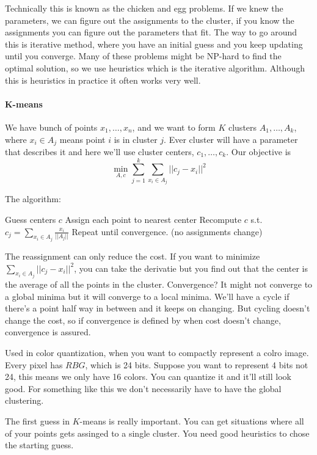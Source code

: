 Technically this is known as the chicken and egg problems. If we knew
the parameters, we can figure out the assignments to the cluster, if
you know the assignments you can figure out the parameters that
fit. The way to go around this is iterative method, where you have an
initial guess and you keep updating until you converge. Many of these problems
might be NP-hard to find the optimal solution, so we use heuristics
which is the iterative algorithm. Although this is heuristics in
practice it often works very well.

\paragraph{K-means}
\label{sec:k-means}
We have bunch of points $x_1, \dots, x_n$, and we want to form $K$
clusters $A_1, \dots , A_k$, where $x_i \in A_j$ means point $i$ is in
cluster $j$. Ever cluster will have a parameter that describes it and
here we'll use cluster centers, $c_1, \dots, c_k$. Our objective is
\begin{equation}
  \label{eq:41}
  \min_{A, c} \sum_{j=1}^k\sum_{x_i\in A_j} ||c_j - x_i||^2
\end{equation}

The algorithm:
\begin{enumerate}
\STATE   Guess centers $c$
\STATE Assign each point to nearest center
\STATE Recompute $c$ s.t. $c_j  = \sum_{x_i\in
  A_j}\frac{x_i}{||A_j||}$
\STATE Repeat until convergence. (no assignments change)
\end{enumerate}

The reassignment can only reduce the cost. If you want to
minimize $\sum_{x_i\in A_j} ||c_j - x_i||^2$, you can take the
derivatie but you find out that the center is the average of all the
points in the cluster. Convergence? It might not converge to a global
minima but it will converge to a local minima. We'll have a cycle if
there's a point half way in between and it keeps on changing. But
cycling doesn't change the cost, so if convergence is defined by when
cost doesn't change, convergence is assured. 

Used in color quantization, when you want to compactly represent a
colro image. Every pixel has $RBG$, which is 24 bits. Suppose you want
to represent 4 bits not 24, this means we only have 16 colors. You can
quantize it and it'll still look good. For something like this we
don't necessarily have to have the global clustering. 

The first guess in $K$-means is really important. You can get
situations where all of your points gets assinged to a single
cluster. You need good heuristics to chose the starting guess. 

\pagebreak

\pagebreak

\pagebreak





